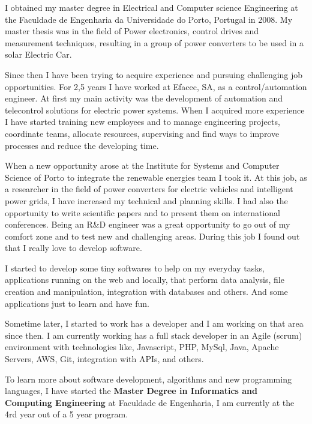 \documentclass[letterpaper,11pt]{article}
\newlength{\outerbordwidth}
\newcommand{\resheading}[1]{\vspace{4pt}
  \parbox{\textwidth}{\setlength{\FrameSep}{\outerbordwidth}
    \begin{shaded}
\setlength{\fboxsep}{0pt}\framebox[\textwidth][l]{\setlength{\fboxsep}{4pt}\fcolorbox{shadecolorB}{shadecolorB}{\textbf{\sffamily{\mbox{~}\makebox[6.762in][l]{\large #1} \vphantom{p\^{E}}}}}}
    \end{shaded}
  }\vspace{4pt}
}
\newcommand{\cvevent}[1]{\vspace{5pt}
  \parbox{\textwidth}{\setlength{\FrameSep}{\outerbordwidth}
    \begin{shaded}
        \setlength{\fboxsep}{0pt}{\setlength{\fboxsep}{4pt}\fcolorbox{sectcol}{sectcol}{\textbf{\sffamily{\mbox{~}\makebox[6.762in][l]{\textcolor{white}{\large \uppercase{#1}}} \vphantom{p\^{E}}}}}}
    \end{shaded}
  }\vspace{40pt}
}
\begin{document}
\vspace{0.2in}		%


\resheading{\faUser\hspace{4pt}Summary}
\begin{center}
	\parbox{6.762in}{I obtained my master degree in Electrical and Computer science Engineering at the Faculdade de Engenharia da Universidade do Porto, Portugal in 2008. My master thesis was in the field of Power electronics, control drives and measurement techniques, resulting in a group of power converters to be used in a solar Electric Car. %
	
	Since then I have been trying to acquire experience and pursuing challenging job opportunities. For 2,5 years I have worked at Efacec, SA, as a control/automation engineer. At first my main activity was the development of automation and telecontrol solutions for electric power systems. When I acquired more experience I have started training new employees and to manage engineering projects, coordinate teams, allocate resources, supervising and find ways to improve processes and reduce the developing time.
	
	When a new opportunity arose at the Institute for Systems and Computer Science of Porto to integrate the renewable energies team I took it. At this job, as a researcher in the field of power converters for electric vehicles and intelligent power grids, I have increased my technical and planning skills. I had also the opportunity to write scientific papers and to present them on international conferences. Being an R\&D engineer was a great opportunity to go out of my comfort zone and to test new and challenging areas. During this job I found out that I really love to develop software.
	
	I started to develop some tiny softwares to help on my everyday tasks, applications running on the web and locally, that perform data analysis, file creation and manipulation, integration with databases and others. And some applications just to learn and have fun.
	
	Sometime later, I started to work has a developer and I am working on that area since then. I am currently working has a full stack developer in an Agile (scrum) environment with technologies like, Javascript, PHP, MySql, Java, Apache Servers, AWS, Git, integration with APIs, and others.
	
	To learn more about software development, algorithms and new programming languages, I have started the \textbf{Master Degree in Informatics and Computing Engineering} at Faculdade de Engenharia, I am currently at the 4rd year out of a 5 year program. }
\end{center}
\end{document}

